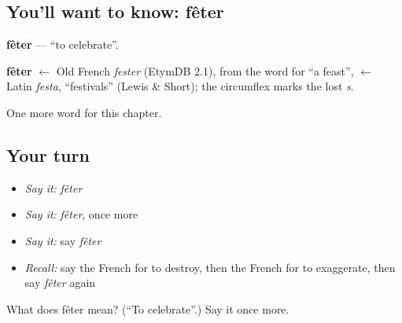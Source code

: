 \subsection*{You'll want to know: fêter}
\textbf{fêter} — \textquotedblleft{}to celebrate\textquotedblright{}.

\begin{cousinweb}
\textbf{fêter} $\leftarrow$ Old French \emph{fester} (EtymDB 2.1), from the word for \textquotedblleft{}a feast\textquotedblright{}, $\leftarrow$ Latin \emph{festa}, \textquotedblleft{}festivals\textquotedblright{} (Lewis \& Short); the circumflex marks the lost \emph{s}.
\end{cousinweb}

\begin{grammarlens}[title={What you've built}]
One more word for this chapter.
\end{grammarlens}

\subsection*{Your turn}
\begin{itemize}
\raggedright
  \item \emph{Say it:} \emph{fêter}
  \item \emph{Say it:} \emph{fêter}, once more
  \item \emph{Say it:} say \emph{fêter}
  \item \emph{Recall:} say the French for to destroy, then the French for to exaggerate, then say \emph{fêter} again
\end{itemize}

\begin{tcolorbox}[breakable,colback=teal!4,colframe=teal!35!black,title={Before you move on}]
What does fêter mean? (\textquotedblleft{}To celebrate\textquotedblright{}.) Say it once more.
\end{tcolorbox}
